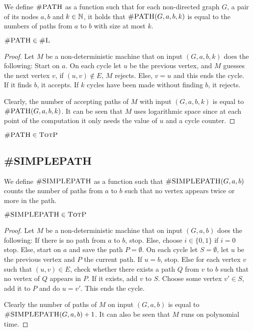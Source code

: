 We define $\textsc{\#PATH}$ as a function such that for each non-directed graph $G$, a pair of its nodes $a,b$ and $k\in\mathbb{N}$, it holds that $\textsc{\#PATH}(G,a,b,k)$ is equal to the numbers of paths from $a$ to $b$ with size at most $k$.

\begin{theo}
	 $\textsc{\#PATH} \in \textsc{\#L}$
\end{theo}
\begin{proof}
	Let $M$ be a non-deterministic machine that on input $(G,a,b,k)$ does the following: Start on $a$. On each cycle let $u$ be the previous vertex, and $M$ guesses the next vertex $v$, if $(u,v)\not\in E$, $M$ rejects. Else, $v = u$ and this ends the cycle. If it finds $b$, it accepts. If $k$ cycles have been made without finding $b$, it rejects.
	
	Clearly, the number of accepting paths of $M$ with input $(G,a,b,k)$ is equal to $\textsc{\#PATH}(G,a,b,k)$. It can be seen that $M$ uses logarithmic space since at each point of the computation it only needs the value of $u$ and a cycle counter.
\end{proof}

\begin{coro}
	 $\textsc{\#PATH} \in \textsc{TotP}$
\end{coro}

\subsection{\#SIMPLEPATH}

We define $\textsc{\#SIMPLEPATH}$ as a function such that $\textsc{\#SIMPLEPATH}(G,a,b)$ counts the number of paths from $a$ to $b$ such that no vertex appears twice or more in the path.

\begin{coro}
	$\textsc{\#SIMPLEPATH} \in \textsc{TotP}$
\end{coro}
\begin{proof}
	Let $M$ be a non-deterministic machine that on input $(G,a,b)$ does the following: If there is no path from $a$ to $b$, stop. Else, choose $i\in\{0,1\}$ if $i = 0$ stop. Else, start on $a$ and save the path $P=\emptyset$. On each cycle let $S = \emptyset$, let $u$ be the previous vertex and $P$ the current path. If $u = b$, stop. Else for each vertex $v$ such that $(u,v)\in E$, check whether there exists a path $Q$ from $v$ to $b$ such that no vertex of $Q$ appears in $P$. If it exists, add $v$ to $S$. Choose some vertex $v'\in S$, add it to $P$ and do $u = v'$. This ends the cycle.
	
	Clearly the number of paths of $M$ on input $(G,a,b)$ is equal to $\textsc{\#SIMPLEPATH}(G,a,b)+1$. It can also be seen that $M$ runs on polynomial time.
\end{proof}


